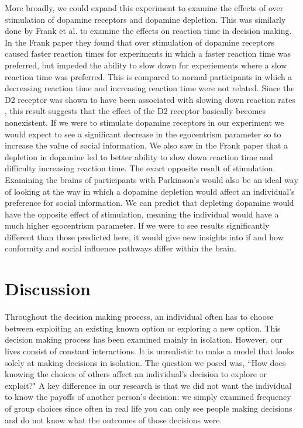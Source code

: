 \documentclass[11pt, a4paper]{article}
\begin{document}
More broadly, we could expand this experiment to examine the effects of over stimulation of dopamine receptors and dopamine depletion. This was similarly done by Frank et al. \cite{Frank2009} to examine the effects on reaction time in decision making. In the Frank paper they found that over stimulation of dopamine receptors caused faster reaction times for experiments in which a faster reaction time was preferred, but impeded the ability to slow down for experiements where a slow reaction time was preferred. This is compared to normal participants in which a decreasing reaction time and increasing reaction time were not related. Since the D2 receptor was shown to have been associated with slowing down reaction rates \cite{Frank2009}, this result suggests that the effect of the D2 receptor basically becomes nonexistent. If we were to stimulate dopamine receptors in our experiment we would expect to see a significant decrease in the egocentrism parameter so to increase the value of social information. We also saw in the Frank paper that a depletion in dopamine led to better ability to slow down reaction time and difficulty increasing reaction time. The exact opposite result of stimulation. Examining the brains of participants with Parkinson's would also be an ideal way of looking at the way in which a dopamine depletion would affect an individual's preference for social information. We can predict that depleting dopamine would have the opposite effect of stimulation, meaning the individual would have a much higher egocentrism parameter. If we were to see results significantly different than those predicted here, it would give new insights into if and how conformity and social influence pathways differ within the brain.

\section{Discussion}
Throughout the decision making process, an individual often has to choose between exploiting an existing known option or exploring a new option. This decision making process has been examined mainly in isolation. However, our lives consist of constant interactions. It is unrealistic to make a model that looks solely at making decisions in isolation. The question we posed was, ``How does knowing the choices of others affect an individual's decision to explore or exploit?" A key difference in our research is that we did not want the individual to know the payoffs of another person's decision: we simply examined frequency of group choices since often in real life you can only see people making decisions and do not know what the outcomes of those decisions were.
\end{document}
